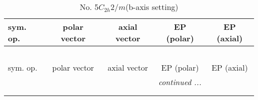 \documentclass[fleqn,10pt,landscape]{jsarticle}
\begin{document}
\newpage
\begin{center}
\renewcommand{\arraystretch}{1.3}
\begin{longtable}{lcccc}
\caption{No. 5\quad$C_{2h}$\quad$2/m$\quad(b-axis setting)\quad[ monoclinic ]}
 \\
 \hline \hline
sym. op. & polar vector & axial vector & EP (polar) & EP (axial) \\ \hline \endfirsthead

\multicolumn{4}{l}{\tablename\ \thetable{}} \\
 \hline \hline
sym. op. & polar vector & axial vector & EP (polar) & EP (axial) \\ \hline \endhead

 \hline \hline
\multicolumn{4}{r}{\footnotesize\it continued ...} \\ \endfoot

 \hline \hline
\multicolumn{4}{r}{} \\ \endlastfoot


\end{longtable}
\end{center}
\end{document}
